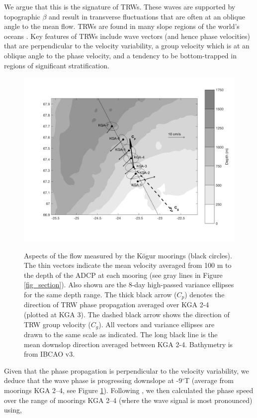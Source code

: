 \documentclass[12pt,titlepage,figuresatend]{article}
\begin{document}
We argue that this is the signature of TRWs. These waves are supported by topographic $\beta$ and result in transverse fluctuations that are often at an oblique angle to the mean flow. TRWs are found in many slope regions of the world’s oceans \cite[]{Garrett1979,Louis1982,Pickart1990}. Key features of TRWs include wave vectors (and hence phase velocities) that are perpendicular to the velocity variability, a group velocity which is at an oblique angle to the phase velocity, and a tendency to be bottom-trapped in regions of significant stratification.

\begin{figure}[ht!]
  \centering\includegraphics[width=\hsize]{./figures/map_ellipse.pdf}
  \caption{Aspects of the flow measured by the K\"{o}gur moorings (black circles). The thin vectors indicate the mean velocity averaged from 100 m to the depth of the ADCP at each mooring (see gray lines in Figure \ref{fig_section}). Also shown are the 8-day high-passed variance ellipses for the same depth range. The thick black arrow ($C_{p}$) denotes the direction of TRW phase propagation averaged over KGA 2-4 (plotted at KGA 3). The dashed black arrow shows the direction of TRW group velocity ($C_{g}$). All vectors and variance ellipses are drawn to the same scale as indicated. The long black line is the mean downslop direction averaged between KGA 2-4. Bathymetry is from IBCAO v3.}{\label{fig_ellipse}}
\end{figure}

Given that the phase propagation is perpendicular to the velocity variability, we deduce that the wave phase is progressing downslope at -9$^{\circ}$T (average from moorings KGA 2--4, see Figure \ref{fig_ellipse}). Following \cite{Pickart1990}, we then calculated the phase speed over the range of moorings KGA 2--4 (where the wave signal is most pronounced) using,
\end{document}
